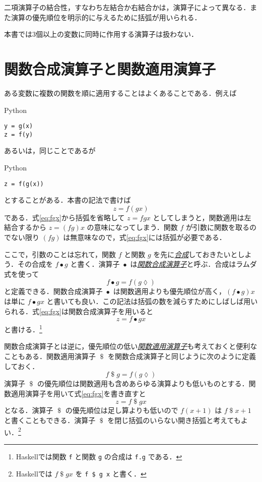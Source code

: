 \documentclass[a4paper,draft]{jsbook}
\newcommand{\programminglanguage}[1]{\textsf{#1}}
\newcommand{\haskell}{\programminglanguage{Haskell}}
\newcommand{\python}{\programminglanguage{Python}}
\newcommand{\keyword}[1]{{\underline{\emph{#1}}}}
\newcommand{\code}[1]{\texttt{#1}}
\newenvironment{pythoncode}{\begin{itembox}[r]{\python}}{\end{itembox}}
\newcommand{\mAnonParameter}{\lozenge}
\DeclareMathOperator{\mComp}{\bullet}
\DeclareMathOperator{\mApply}{\$}
\begin{document}
二項演算子の結合性，すなわち左結合か右結合かは，演算子によって異なる．また演算の優先順位を明示的に与えるために括弧が用いられる．

本書では3個以上の変数に同時に作用する演算子は扱わない．

\section{関数合成演算子と関数適用演算子}

ある変数に複数の関数を順に適用することはよくあることである．例えば
\begin{pythoncode}
\begin{verbatim}
y = g(x)
z = f(y)
\end{verbatim}
\end{pythoncode}
あるいは，同じことであるが
\begin{pythoncode}
\begin{verbatim}
z = f(g(x))
\end{verbatim}
\end{pythoncode}
とすることがある．本書の記法で書けば
\begin{equation}
\label{eq:fgx}
z=f(gx)
\end{equation}
である．式\eqref{eq:fgx}から括弧を省略して $z=fgx$ としてしまうと，関数適用は左結合するから $z=(fg)x$ の意味になってしまう．関数 $f$ が引数に関数を取るのでない限り $(fg)$ は無意味なので，式\eqref{eq:fgx}には括弧が必要である．

ここで，引数のことは忘れて，関数 $f$ と関数 $g$ を先に\keyword{合成}しておきたいとしよう．その合成を $f\mComp g$ と書く．演算子 $\mComp$ は\keyword{関数合成演算子}と呼ぶ．合成はラムダ式を使って
\begin{equation}
f\mComp g=f(g\mAnonParameter)
\end{equation}
と定義できる．関数合成演算子 $\mComp$ は関数適用よりも優先順位が高く，$\left(f\mComp g\right)x$ は単に $f\mComp gx$ と書いても良い．この記法は括弧の数を減らすためにしばしば用いられる．式\eqref{eq:fgx}は関数合成演算子を用いると
\begin{equation}
z=f\mComp gx
\end{equation}
と書ける．\footnote{\haskell では関数 \code{f} と関数 \code{g} の合成は \code{f.g} である．}

関数合成演算子とは逆に，優先順位の低い\keyword{関数適用演算子}も考えておくと便利なこともある．関数適用演算子 $\mApply$ を関数合成演算子と同じように次のように定義しておく．
\begin{equation}
f\mApply g=f\left(g\mAnonParameter\right)
\end{equation}
演算子 $\mApply$ の優先順位は関数適用も含めあらゆる演算よりも低いものとする．関数適用演算子を用いて式\eqref{eq:fgx}を書き直すと
\begin{equation}
z=f\mApply gx
\end{equation}
となる．演算子 $\mApply$ の優先順位は足し算よりも低いので $f(x+1)$ は $f\mApply  x+1$ と書くこともできる．演算子 $\mApply$ を閉じ括弧のいらない開き括弧と考えてもよい．\footnote{\haskell では $f\mApply gx$ を \code{f \$ g x} と書く．}
\end{document}
